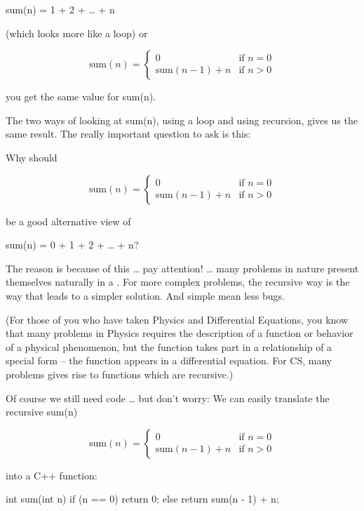 sum(n) = 1 + 2 + \ldots{} + n

(which looks more like a loop) or

\[
\text{sum}(n) = \begin{cases}
0 & \text{if } n = 0 \\
\text{sum}(n - 1) + n & \text{if } n > 0
\end{cases}
\]

you get the same value for sum(n).


The two ways of looking at sum(n), using a loop and using recursion,
gives us the same result. The really important question to ask is this:

Why should

\[
\text{sum}(n) = \begin{cases}
0 & \text{if } n = 0 \\
\text{sum}(n - 1) + n & \text{if } n > 0
\end{cases}
\]

be a good alternative view of

sum(n) = 0 + 1 + 2 + \ldots{} + n?

The reason is because of this \ldots{} pay attention! \ldots{} many
problems in nature present themselves naturally in a . For more complex problems, the recursive way is the way that leads
to a simpler solution. And simple mean less bugs.

(For those of you who have taken Physics and Differential Equations, you
know that many problems in Physics requires the description of a
function or behavior of a physical phenomenon, but the function takes
part in a relationship of a special form -- the function appears in a
differential equation. For CS, many problems gives rise to functions
which are recursive.)

Of course we still need code \ldots{} but don't worry: We can easily
translate the recursive sum(n)

\[
\text{sum}(n) = \begin{cases}
0 & \text{if } n = 0 \\
\text{sum}(n - 1) + n & \text{if } n > 0
\end{cases}
\]

into a C++ function:

\begin{consolethree}[escapeinside=||]
int sum(int n)
{
    if (n == 0)
    {
        return 0;
    }
    else
    {
        return sum(n - 1) + n;
    }
}
\end{consolethree}

